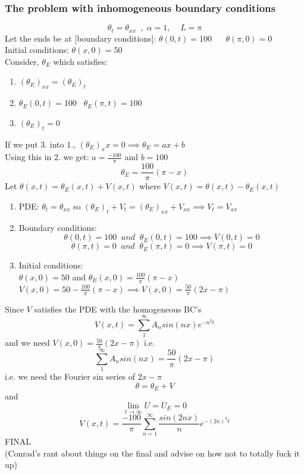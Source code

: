 \documentclass[11pt]{article}
\theoremstyle{definition}
\begin{document}
\subsubsection{The problem with inhomogeneous boundary conditions}
$$\theta_t = \theta_{xx}\;\;, \; \alpha = 1,\;\;\;\; L = \pi$$
Let the ends be at [boundary conditions]:
$\theta(0,t) = 100\;\;\;\;\;\; \theta(\pi,0) = 0$\\
Initial conditions: $\theta(x,0) = 50$\\
Consider, $\theta_E$ which satisfies:
\begin{enumerate}[topsep=0pt]
    \item $(\theta_E)_{xx} = (\theta_E)_t$
    \item $\theta_E(0,t) = 100\;\;\; \theta_E(\pi,t) = 100$
    \item $(\theta_E)_t = 0$
\end{enumerate}
If we put 3. into 1., $(\theta_E)_xx = 0 \implies \theta_E = ax + b$\\
Using this in 2. we get:
$a = \frac{-100}{\pi}$ and $b = 100$
$$\theta_E = \frac{100}{\pi}(\pi - x)$$
Let $\theta(x,t) = \theta_E(x,t) + V(x,t)$ where $ V(x,t) = \theta(x,t) - \theta_E(x,t)$
\begin{enumerate}
    \item PDE: $\theta_t = \theta_{xx}$ so $(\theta_E)_t + V_t = (\theta_E)_{xx} + V_{xx} \implies V_t = V_{xx}$
    \item Boundary conditions: $$\theta(0,t) = 100\;\; and \;\; \theta_E(0,t) = 100 \implies V(0,t) = 0$$  $$\theta(\pi,t) = 0\;\; and \;\; \theta_E(\pi,t) = 0 \implies V(\pi,t) = 0$$
    \item Initial conditions:\\
    $\theta(x,0) = 50$ and $\theta_E(x,0) = \frac{100}{\pi}(\pi - x)$\\
    $V(x,0) = 50 - \frac{100}{\pi}(\pi - x) \implies V(x,0) = \frac{50}{\pi}(2x-\pi)$
\end{enumerate}
Since $V$ satisfies the PDE with the homogeneous BC's 
$$V(x,t) = \sum_1^{\infty} A_n sin(nx) e^{-n^2 t}$$ and we need $V(x,0) = \frac{50}{\pi}(2x - \pi)$ i.e. $$\sum_1^{\infty}A_n sin(nx) = \frac{50}{\pi}(2x - \pi)$$ i.e. we need the Fourier sin series of $2x-\pi$
$$\theta = \theta_E + V$$ and $$\lim_{t \to \infty} U = U_E = 0$$
$$V(x,t) = \frac{-100}{\pi}\sum_{n= 1}^{\infty} \frac{sin(2nx)}{n}e^{-(2n)^2t}$$
\newpage
{\LARGE FINAL \\ \large(Conrad's rant about things on the final and advise on how not to totally fuck it up)}\\
\end{document}
